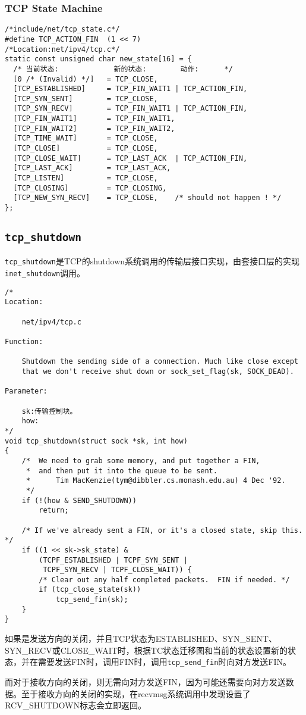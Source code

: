         \subsubsection{TCP State Machine}

\begin{verbatim}
/*include/net/tcp_state.c*/
#define TCP_ACTION_FIN  (1 << 7)
/*Location:net/ipv4/tcp.c*/
static const unsigned char new_state[16] = {
  /* 当前状态:             新的状态:        动作:      */
  [0 /* (Invalid) */]   = TCP_CLOSE,
  [TCP_ESTABLISHED]     = TCP_FIN_WAIT1 | TCP_ACTION_FIN,
  [TCP_SYN_SENT]        = TCP_CLOSE,
  [TCP_SYN_RECV]        = TCP_FIN_WAIT1 | TCP_ACTION_FIN,
  [TCP_FIN_WAIT1]       = TCP_FIN_WAIT1,
  [TCP_FIN_WAIT2]       = TCP_FIN_WAIT2,
  [TCP_TIME_WAIT]       = TCP_CLOSE,
  [TCP_CLOSE]           = TCP_CLOSE,
  [TCP_CLOSE_WAIT]      = TCP_LAST_ACK  | TCP_ACTION_FIN,
  [TCP_LAST_ACK]        = TCP_LAST_ACK,
  [TCP_LISTEN]          = TCP_CLOSE,
  [TCP_CLOSING]         = TCP_CLOSING,
  [TCP_NEW_SYN_RECV]    = TCP_CLOSE,    /* should not happen ! */
};
\end{verbatim}
    \subsection{\texttt{tcp_shutdown}}

        \texttt{tcp_shutdown}是TCP的shutdown系统调用的传输层接口实现，由套接口层的实现\texttt{inet_shutdown}调用。
\begin{verbatim}
/*
Location:

    net/ipv4/tcp.c

Function:
    
    Shutdown the sending side of a connection. Much like close except
    that we don't receive shut down or sock_set_flag(sk, SOCK_DEAD).

Parameter:

    sk:传输控制块。
    how:
*/
void tcp_shutdown(struct sock *sk, int how)
{
    /*  We need to grab some memory, and put together a FIN,
     *  and then put it into the queue to be sent.
     *      Tim MacKenzie(tym@dibbler.cs.monash.edu.au) 4 Dec '92.
     */
    if (!(how & SEND_SHUTDOWN))
        return;

    /* If we've already sent a FIN, or it's a closed state, skip this. */
    if ((1 << sk->sk_state) &
        (TCPF_ESTABLISHED | TCPF_SYN_SENT |
         TCPF_SYN_RECV | TCPF_CLOSE_WAIT)) {
        /* Clear out any half completed packets.  FIN if needed. */
        if (tcp_close_state(sk))
            tcp_send_fin(sk);
    }
}
\end{verbatim}
        如果是发送方向的关闭，并且TCP状态为ESTABLISHED、SYN\_SENT、SYN\_RECV或CLOSE\_WAIT时，根据TC状态迁移图和当前的状态设置新的状态，并在需要发送FIN时，调用FIN时，调用\texttt{tcp_send_fin}时向对方发送FIN。

        而对于接收方向的关闭，则无需向对方发送FIN，因为可能还需要向对方发送数据。至于接收方向的关闭的实现，在recvmsg系统调用中发现设置了RCV\_SHUTDOWN标志会立即返回。


